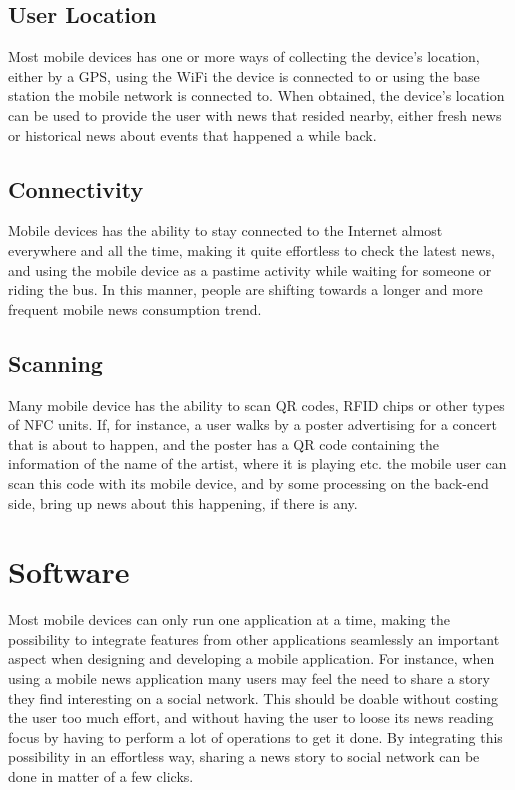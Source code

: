 \subsection{User Location}
Most mobile devices has one or more ways of collecting the device's location, either by a GPS, using the WiFi the device is connected to or using the base station the mobile network is connected to. When obtained, the device's location can be used to provide the user with news that resided nearby, either fresh news or historical news about events that happened a while back.

\subsection{Connectivity}
Mobile devices has the ability to stay connected to the Internet almost everywhere and all the time, making it quite effortless to check the latest news, and using the mobile device as a pastime activity while waiting for someone or riding the bus. In this manner, people are shifting towards a longer and more frequent mobile news consumption trend\cite{stateofthemedia2012}.

\subsection{Scanning}
Many mobile device has the ability to scan QR codes, RFID chips or other types of NFC units. If, for instance, a user walks by a poster advertising for a concert that is about to happen, and the poster has a QR code containing the information of the name of the artist, where it is playing etc. the mobile user can scan this code with its mobile device, and by some processing on the back-end side, bring up news about this happening, if there is any.

\section{Software}
Most mobile devices can only run one application at a time, making the possibility to integrate features from other applications seamlessly an important aspect when designing and developing a mobile application. For instance, when using a mobile news application many users may feel the need to share a story they find interesting on a social network. This should be doable without costing the user too much effort, and without having the user to loose its news reading focus by having to perform a lot of operations to get it done. By integrating this possibility in an effortless way, sharing a news story to social network can be done in matter of a few clicks. 

